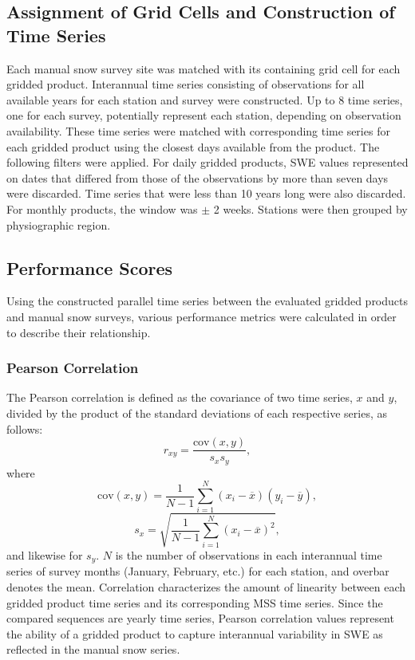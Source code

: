 \documentclass[12pt]{article}
\begin{document}
\subsection{Assignment of Grid Cells and Construction of Time Series}
Each manual snow survey site was matched with its containing grid cell for each gridded product.  Interannual time series consisting of observations for all available years for each station and survey were constructed.  Up to 8 time series, one for each survey, potentially represent each station, depending on observation availability.  These time series were matched with corresponding time series for each gridded product using the closest days available from the product.  The following filters were applied.  For daily gridded products, SWE values represented on dates that differed from those of the observations by more than seven days were discarded.  
Time series that were less than 10 years long were also discarded.  For monthly products, the window was $\pm$ 2 weeks.  Stations were then grouped by physiographic region.

\subsection{Performance Scores}
Using the constructed parallel time series between the evaluated gridded products and manual snow surveys, various performance metrics were calculated in order to describe their relationship.  

\subsubsection{Pearson Correlation}
The Pearson correlation is defined as the covariance of two time series, $x$ and $y$, divided by the product of the standard deviations of each respective series, as follows:
\begin{equation}
r_{xy} = \frac{\text{cov}(x,y)}{s_xs_y},
\end{equation}
where
\begin{equation}
\text{cov}(x,y) = \frac{1}{N-1}\sum_{i=1}^{N}(x_i-\overline{x})(y_i-\overline{y}),
\end{equation}
\begin{equation}
s_x=\sqrt{\frac{1}{N-1}\sum_{i=1}^{N}(x_i-\overline{x})^2},
\end{equation}
and likewise for $s_y$. $N$ is the number of observations in each interannual time series of survey months (January, February, etc.) for each station, and overbar denotes the mean.  Correlation characterizes the amount of linearity between each gridded product time series and its corresponding MSS time series.  Since the compared sequences are yearly time series, Pearson correlation values represent the ability of a gridded product to capture interannual variability in SWE as reflected in the manual snow series.  
\end{document}

